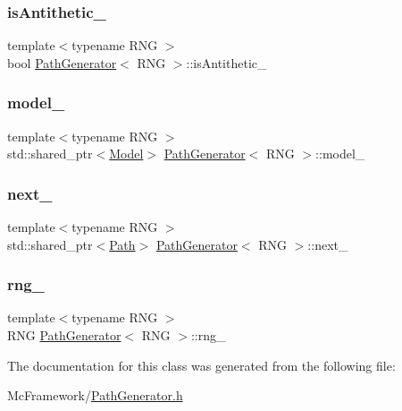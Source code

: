 \subsubsection{\texorpdfstring{is\+Antithetic\+\_\+}{isAntithetic\_}}
{\footnotesize\ttfamily template$<$typename R\+NG $>$ \\
bool \hyperlink{class_path_generator}{Path\+Generator}$<$ R\+NG $>$\+::is\+Antithetic\+\_\+\hspace{0.3cm}{\ttfamily [private]}}

\hypertarget{class_path_generator_a80dcaacd0b79c84c4bf83e980f5ed7ff}{}\label{class_path_generator_a80dcaacd0b79c84c4bf83e980f5ed7ff} 
\subsubsection{\texorpdfstring{model\+\_\+}{model\_}}
{\footnotesize\ttfamily template$<$typename R\+NG $>$ \\
std\+::shared\+\_\+ptr$<$\hyperlink{class_model}{Model}$>$ \hyperlink{class_path_generator}{Path\+Generator}$<$ R\+NG $>$\+::model\+\_\+\hspace{0.3cm}{\ttfamily [private]}}

\hypertarget{class_path_generator_a2af5b3cab0498565a56b20e97a3d6f35}{}\label{class_path_generator_a2af5b3cab0498565a56b20e97a3d6f35} 
\subsubsection{\texorpdfstring{next\+\_\+}{next\_}}
{\footnotesize\ttfamily template$<$typename R\+NG $>$ \\
std\+::shared\+\_\+ptr$<$\hyperlink{class_path}{Path}$>$ \hyperlink{class_path_generator}{Path\+Generator}$<$ R\+NG $>$\+::next\+\_\+\hspace{0.3cm}{\ttfamily [private]}}

\hypertarget{class_path_generator_ae8b29fa9173cf38dfc448375163adf25}{}\label{class_path_generator_ae8b29fa9173cf38dfc448375163adf25} 
\subsubsection{\texorpdfstring{rng\+\_\+}{rng\_}}
{\footnotesize\ttfamily template$<$typename R\+NG $>$ \\
R\+NG \hyperlink{class_path_generator}{Path\+Generator}$<$ R\+NG $>$\+::rng\+\_\+\hspace{0.3cm}{\ttfamily [private]}}



The documentation for this class was generated from the following file\+:\begin{DoxyCompactItemize}
\item 
Mc\+Framework/\hyperlink{_path_generator_8h}{Path\+Generator.\+h}\end{DoxyCompactItemize}
